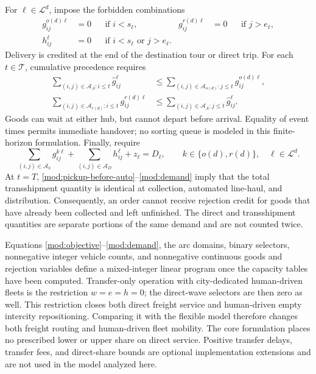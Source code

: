 For $\ell\in\mathcal L^d$, impose the forbidden combinations
\begin{align}
 g_{ij}^{o(d)\ell}&=0 &&\text{if }i<s_\ell,
 &g_{ij}^{r(d)\ell}&=0 &&\text{if }j>e_\ell,
 \label{mod:local-windows}\\
 h_{ij}^{\ell}&=0 &&\text{if }i<s_\ell\text{ or }j>e_\ell.
 \label{mod:direct-windows}
\end{align}
Delivery is credited at the end of the destination tour or direct trip.
For each $t\in\mathcal T$, cumulative precedence requires
\begin{align}
 \sum_{(i,j)\in\mathcal A_A:i\leq t}\widehat g_{ij}^{\ell}
 &\leq\sum_{(i,j)\in\mathcal A_{o(d)}:j\leq t}g_{ij}^{o(d)\ell},
 \label{mod:pickup-before-auto}\\
 \sum_{(i,j)\in\mathcal A_{r(d)}:i\leq t}g_{ij}^{r(d)\ell}
 &\leq\sum_{(i,j)\in\mathcal A_A:j\leq t}\widehat g_{ij}^{\ell}.
 \label{mod:auto-before-delivery}
\end{align}
Goods can wait at either hub, but cannot depart before arrival. Equality
of event times permits immediate handover; no sorting queue is modeled in
this finite-horizon formulation. Finally, require
\begin{equation}
 \sum_{(i,j)\in\mathcal A_k}g_{ij}^{k\ell}
 +\sum_{(i,j)\in\mathcal A_D}h_{ij}^{\ell}+z_\ell=D_\ell,
 \qquad k\in\{o(d),r(d)\},\quad \ell\in\mathcal L^d.
 \label{mod:demand}
\end{equation}
At $t=T$, \eqref{mod:pickup-before-auto}--\eqref{mod:demand} imply that
the total transshipment quantity is identical at collection, automated
line-haul, and distribution. Consequently, an order cannot receive rejection
credit for goods that have already been collected and left unfinished.
The direct and transshipment quantities are separate portions of the same
demand and are not counted twice.

Equations \eqref{mod:objective}--\eqref{mod:demand}, the arc domains, binary
selectors, nonnegative integer vehicle counts, and nonnegative continuous
goods and rejection variables define a mixed-integer linear program once
the capacity tables have been computed. Transfer-only operation with city-dedicated human-driven fleets is the
restriction $w=e=h=0$; the direct-wave selectors are then zero as well.
This restriction closes both direct freight service and human-driven empty
intercity repositioning. Comparing it with the flexible model therefore
changes both freight routing and human-driven fleet mobility.
The core formulation places no prescribed lower or upper share on direct
service. Positive transfer delays, transfer fees, and direct-share bounds
are optional implementation extensions and are not used in the model
analyzed here.

